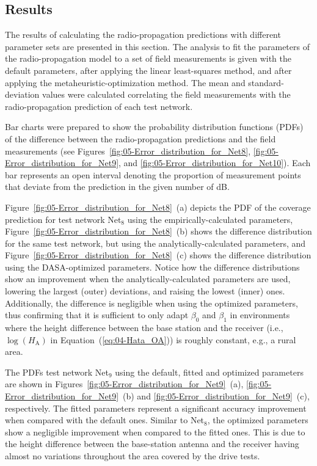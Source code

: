 \subsection{Results \label{sub:05-Least_squares_results}}

The results of calculating the radio-propagation predictions with
different parameter sets are presented in this section. The analysis
to fit the parameters of the radio-propagation model to a set of field
measurements is given with the default parameters, after applying
the linear least-squares method, and after applying the metaheuristic-optimization
method. The mean and standard-deviation values were calculated correlating
the field measurements with the radio-propagation prediction of each
test network.

Bar charts were prepared to show the probability distribution functions
(PDFs) of
the difference between the radio-propagation predictions and the field
measurements (see Figures~\ref{fig:05-Error_distribution_for_Net8},
\ref{fig:05-Error_distribution_for_Net9}, and \ref{fig:05-Error_distribution_for_Net10}).
Each bar represents an open interval denoting the proportion of measurement
points that deviate from the prediction in the given number of dB.

Figure~\ref{fig:05-Error_distribution_for_Net8}~(a) depicts the
PDF of the coverage prediction for test network Net$_{8}$ using the
empirically-calculated parameters, Figure~\ref{fig:05-Error_distribution_for_Net8}~(b)
shows the difference distribution for the same test network, but using
the analytically-calculated parameters, and Figure~\ref{fig:05-Error_distribution_for_Net8}~(c)
shows the difference distribution using the DASA-optimized parameters.
Notice how the difference distributions show an improvement when the
analytically-calculated parameters are used, lowering the largest
(outer) deviations, and raising the lowest (inner) ones. Additionally,
the difference is negligible when using the optimized parameters,
thus confirming that it is sufficient to only adapt $\beta_{0}$ and
$\beta_{1}$ in environments where the height difference between the
base station and the receiver (i.e., $\log(H_{\mathrm{A}})$ in Equation~(\ref{eq:04-Hata_OA}))
is roughly constant, e.g., a rural area.

The PDFs test network Net$_{9}$ using the default, fitted and optimized
parameters are shown in Figures~\ref{fig:05-Error_distribution_for_Net9}~(a),
\ref{fig:05-Error_distribution_for_Net9}~(b) and \ref{fig:05-Error_distribution_for_Net9}~(c),
respectively. The fitted parameters represent a significant accuracy
improvement when compared with the default ones. Similar to Net$_{8}$,
the optimized parameters show a negligible improvement when compared
to the fitted ones. This is due to the height difference between the
base-station antenna and the receiver having almost no variations
throughout the area covered by the drive tests.

